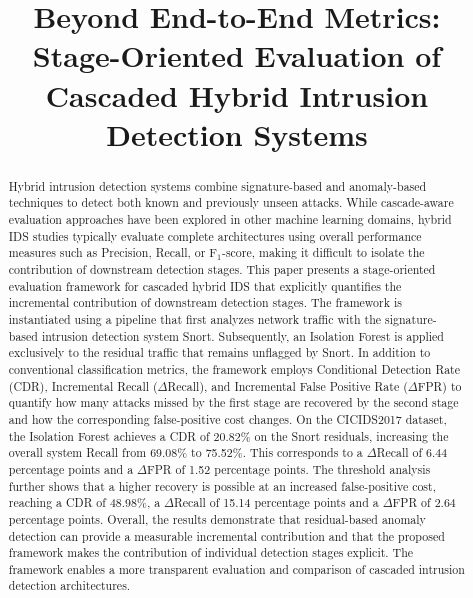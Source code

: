 \documentclass[conference]{IEEEtran}
\begin{document}
\title{Beyond End-to-End Metrics: Stage-Oriented Evaluation of Cascaded Hybrid Intrusion Detection Systems}

\author{
}
\maketitle

\begin{abstract}
Hybrid intrusion detection systems combine signature-based and anomaly-based techniques to detect both known and previously unseen attacks. While cascade-aware evaluation approaches have been explored in other machine learning domains, hybrid IDS studies typically evaluate complete architectures using overall performance measures such as Precision, Recall, or F$_1$-score, making it difficult to isolate the contribution of downstream detection stages. This paper presents a stage-oriented evaluation framework for cascaded hybrid IDS that explicitly quantifies the incremental contribution of downstream detection stages. The framework is instantiated using a pipeline that first analyzes network traffic with the signature-based intrusion detection system Snort. Subsequently, an Isolation Forest is applied exclusively to the residual traffic that remains unflagged by Snort. In addition to conventional classification metrics, the framework employs Conditional Detection Rate (CDR), Incremental Recall ($\Delta$Recall), and Incremental False Positive Rate ($\Delta$FPR) to
quantify  how many attacks missed by the first stage are recovered by the second stage and how the corresponding false-positive cost changes. On the CICIDS2017 dataset, the Isolation Forest achieves a CDR of 20.82\% on the Snort residuals, increasing the overall system Recall from 69.08\% to 75.52\%. This corresponds to a $\Delta$Recall of 6.44 percentage points and a $\Delta$FPR of 1.52 percentage points. The threshold analysis further shows that a higher recovery is possible at an increased false-positive cost, reaching a CDR of 48.98\%, a $\Delta$Recall of 15.14 percentage points and a $\Delta$FPR of 2.64 percentage points. Overall, the results demonstrate that residual-based anomaly detection can provide a measurable incremental contribution and that the proposed framework makes the contribution of individual detection stages explicit. The framework enables a more transparent evaluation and comparison of cascaded intrusion detection architectures.
\end{abstract}
\end{document}
